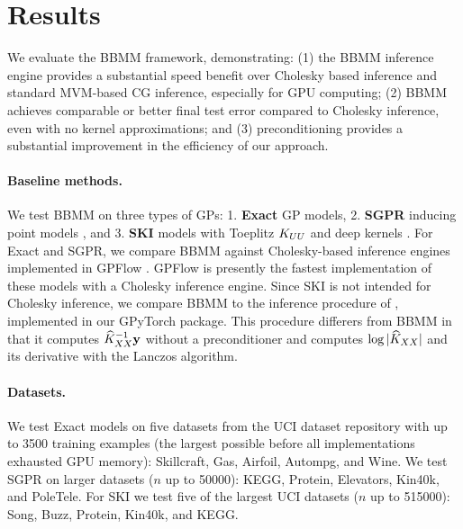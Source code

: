 \section{Results}
\label{sec:bbmm_results}

We evaluate the BBMM framework, demonstrating: (1) the BBMM inference engine provides a substantial speed benefit over Cholesky based inference and standard MVM-based CG inference, especially for GPU computing; (2) BBMM achieves comparable or better final test error compared to Cholesky inference, even with no kernel approximations; and (3) preconditioning provides a substantial improvement in the efficiency of our approach.

\paragraph{Baseline methods.} We test BBMM on three types of GPs:
1. {\bf Exact} GP models,
2. {\bf SGPR} inducing point models \cite{titsias2009variational,hensman2013gaussian},
and 3. {\bf SKI} models with Toeplitz $K_{UU}$ and deep kernels \cite{wilson2015kernel,wilson2016deep}.
For Exact and SGPR, we compare BBMM against Cholesky-based inference engines implemented in GPFlow \cite{matthews2017gpflow}.
GPFlow is presently the fastest implementation of these models with a Cholesky inference engine.
Since SKI is not intended for Cholesky inference, we compare BBMM to the inference procedure of \citet{dong2017scalable}, implemented in our GPyTorch package.
This procedure differers from BBMM in that it computes $\widehat{K}_{XX}^{-1} \mathbf{y}$ without a preconditioner and computes $\log \vert \widehat{K}_{XX} \vert$ and its derivative with the Lanczos algorithm.

\paragraph{Datasets.}
We test Exact models on five datasets from the UCI dataset repository \cite{asuncion2007uci} with up to 3500 training examples (the largest possible before all implementations exhausted GPU memory): Skillcraft, Gas, Airfoil, Autompg, and Wine.
We test SGPR on larger datasets ($n$ up to 50000): KEGG, Protein, Elevators, Kin40k, and PoleTele.
For SKI we test five of the largest UCI datasets ($n$ up to 515000): Song, Buzz, Protein, Kin40k, and KEGG.

